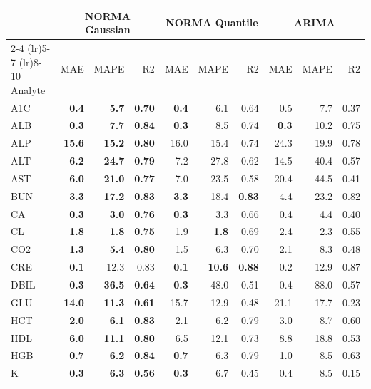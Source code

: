 \begin{table}[ht]
\centering
\footnotesize
\begin{tabular}{lrrrrrrrrr}
\toprule
  & \multicolumn{3}{c}{NORMA Gaussian} & \multicolumn{3}{c}{NORMA Quantile} & \multicolumn{3}{c}{ARIMA} \\
\cmidrule(lr){2-4} \cmidrule(lr){5-7} \cmidrule(lr){8-10}
Analyte & MAE & MAPE & R2 & MAE & MAPE & R2 & MAE & MAPE & R2 \\
\midrule
A1C & \textbf{0.4} & \textbf{5.7} & \textbf{0.70} & \textbf{0.4} & 6.1 & 0.64 & 0.5 & 7.7 & 0.37 \\
ALB & \textbf{0.3} & \textbf{7.7} & \textbf{0.84} & \textbf{0.3} & 8.5 & 0.74 & \textbf{0.3} & 10.2 & 0.75 \\
ALP & \textbf{15.6} & \textbf{15.2} & \textbf{0.80} & 16.0 & 15.4 & 0.74 & 24.3 & 19.9 & 0.78 \\
ALT & \textbf{6.2} & \textbf{24.7} & \textbf{0.79} & 7.2 & 27.8 & 0.62 & 14.5 & 40.4 & 0.57 \\
AST & \textbf{6.0} & \textbf{21.0} & \textbf{0.77} & 7.0 & 23.5 & 0.58 & 20.4 & 44.5 & 0.41 \\
BUN & \textbf{3.3} & \textbf{17.2} & \textbf{0.83} & \textbf{3.3} & 18.4 & \textbf{0.83} & 4.4 & 23.2 & 0.82 \\
CA & \textbf{0.3} & \textbf{3.0} & \textbf{0.76} & \textbf{0.3} & 3.3 & 0.66 & 0.4 & 4.4 & 0.40 \\
CL & \textbf{1.8} & \textbf{1.8} & \textbf{0.75} & 1.9 & \textbf{1.8} & 0.69 & 2.4 & 2.3 & 0.55 \\
CO2 & \textbf{1.3} & \textbf{5.4} & \textbf{0.80} & 1.5 & 6.3 & 0.70 & 2.1 & 8.3 & 0.48 \\
CRE & \textbf{0.1} & 12.3 & 0.83 & \textbf{0.1} & \textbf{10.6} & \textbf{0.88} & 0.2 & 12.9 & 0.87 \\
DBIL & \textbf{0.3} & \textbf{36.5} & \textbf{0.64} & \textbf{0.3} & 48.0 & 0.51 & 0.4 & 88.0 & 0.57 \\
GLU & \textbf{14.0} & \textbf{11.3} & \textbf{0.61} & 15.7 & 12.9 & 0.48 & 21.1 & 17.7 & 0.23 \\
HCT & \textbf{2.0} & \textbf{6.1} & \textbf{0.83} & 2.1 & 6.2 & 0.79 & 3.0 & 8.7 & 0.60 \\
HDL & \textbf{6.0} & \textbf{11.1} & \textbf{0.80} & 6.5 & 12.1 & 0.73 & 8.8 & 18.8 & 0.53 \\
HGB & \textbf{0.7} & \textbf{6.2} & \textbf{0.84} & \textbf{0.7} & 6.3 & 0.79 & 1.0 & 8.5 & 0.63 \\
K & \textbf{0.3} & \textbf{6.3} & \textbf{0.56} & \textbf{0.3} & 6.7 & 0.45 & 0.4 & 8.5 & 0.15 \\

\end{tabular}
\end{table}
